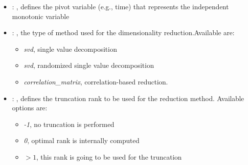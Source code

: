 \begin{itemize}
    \item {}: , 
      defines the pivot variable (e.g., time) that represents the
      independent monotonic variable

    \item {}: , 
      the type of method used for the dimensionality reduction.Available are:
      \begin{itemize}                                                     \item \textit{svd}, single
      value decomposition                                                     \item \textit{svd},
      randomized single value decomposition
      \item \textit{correlation\_matrix}, correlation-based reduction.
      \end{itemize}

    \item {}: , 
      defines the truncation rank to be used for the reduction method.
      Available options are:                                                  \begin{itemize}
      \item \textit{-1}, no truncation is performed
      \item \textit{0}, optimal rank is internally computed
      \item \textit{$>1$}, this rank is going to be used for the truncation
      \end{itemize}
  \end{itemize}
